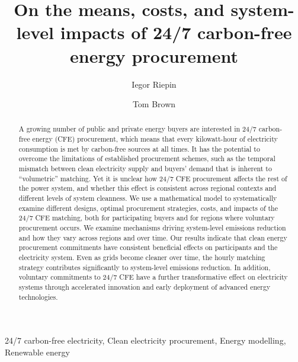 \documentclass[11pt, 5p, nopreprintline]{elsarticle}
\begin{document}
\begin{frontmatter}

	\title{On the means, costs, and system-level impacts of 24/7 carbon-free energy procurement}

	\author[tubaddress]{Iegor Riepin}
    
	\author[tubaddress]{Tom Brown}

	\address[tubaddress]{Department of Digital Transformation in Energy Systems, TU Berlin, Germany}



	\begin{abstract}
		A growing number of public and private energy buyers are interested in 24/7 carbon-free energy (CFE) procurement, which means that every kilowatt-hour of electricity consumption is met by carbon-free sources at all times.
		It has the potential to overcome the limitations of established procurement schemes, such as the temporal mismatch between clean electricity supply and buyers' demand that is inherent to \enquote{volumetric} matching.
		Yet it is unclear how 24/7 CFE procurement affects the rest of the power system, and whether this effect is consistent across regional contexts and different levels of system cleanness.
		We use a mathematical model to systematically examine different designs, optimal procurement strategies, costs, and impacts of the 24/7 CFE matching, both for participating buyers and for regions where voluntary procurement occurs.
		We examine mechanisms driving system-level emissions reduction and how they vary across regions and over time.
		Our results indicate that clean energy procurement commitments have consistent beneficial effects on participants and the electricity system.
		Even as grids become cleaner over time, the hourly matching strategy contributes significantly to system-level emissions reduction.
		In addition, voluntary commitments to 24/7 CFE have a further transformative effect on electricity systems through accelerated innovation and early deployment of advanced energy technologies.

	\end{abstract}

	\begin{keyword}
		24/7 carbon-free electricity,
		Clean electricity procurement,
		Energy modelling,
		Renewable energy
	\end{keyword}


\end{frontmatter}
\end{document}
